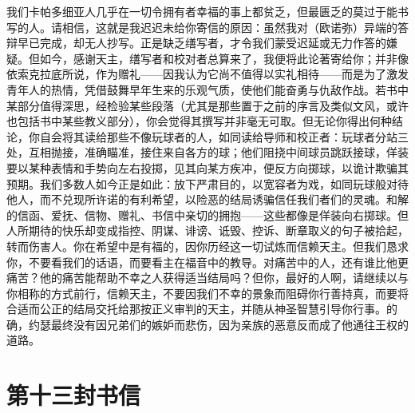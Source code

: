 \par

\par

我们卡帕多细亚人几乎在一切令拥有者幸福的事上都贫乏，但最匮乏的莫过于能书写的人。请相信，这就是我迟迟未给你寄信的原因：虽然我对（欧诺弥）异端的答辩早已完成，却无人抄写。正是缺乏缮写者，才令我们蒙受迟延或无力作答的嫌疑。但如今，感谢天主，缮写者和校对者总算来了，我便将此论著寄给你；并非像依索克拉底所说，作为赠礼——因我认为它尚不值得以实礼相待——而是为了激发青年人的热情，凭借鼓舞早年生来的乐观气质，使他们能奋勇与仇敌作战。若书中某部分值得深思，经检验某些段落（尤其是那些置于之前的序言及类似文风，或许也包括书中某些教义部分），你会觉得其撰写并非毫无可取。但无论你得出何种结论，你自会将其读给那些不像玩球者的人，如同读给导师和校正者：玩球者分站三处，互相抛接，准确瞄准，接住来自各方的球；他们阻挠中间球员跳跃接球，佯装要以某种表情和手势向左右投掷，见其向某方疾冲，便反方向掷球，以诡计欺骗其预期。我们多数人如今正是如此：放下严肃目的，以宽容者为戏，如同玩球般对待他人，而不兑现所许诺的有利希望，以险恶的结局诱骗信任我们者们的灵魂。和解的信函、爱抚、信物、赠礼、书信中亲切的拥抱——这些都像是佯装向右掷球。但人所期待的快乐却变成指控、阴谋、诽谤、诋毁、控诉、断章取义的句子被拾起，转而伤害人。你在希望中是有福的，因你历经这一切试炼而信赖天主。但我们恳求你，不要看我们的话语，而要看主在福音中的教导。对痛苦中的人，还有谁比他更痛苦？他的痛苦能帮助不幸之人获得适当结局吗？但你，最好的人啊，请继续以与你相称的方式前行，信赖天主，不要因我们不幸的景象而阻碍你行善持真，而要将合适而公正的结局交托给那按正义审判的天主，并随从神圣智慧引导你行事。的确，约瑟最终没有因兄弟们的嫉妒而悲伤，因为亲族的恶意反而成了他通往王权的道路。\par



\section{第十三封书信}

\par

